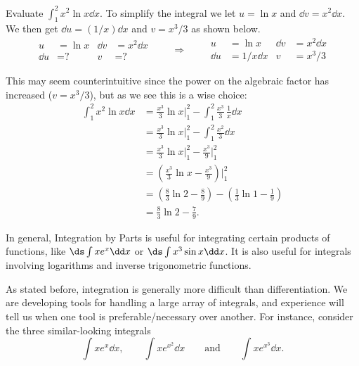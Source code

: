 \begin{example}\label{ex_ibp7}%
Evaluate $\displaystyle \int_1^2 x^2 \ln x\dd x$.
\solution
To simplify the integral we let $u=\ln x$ and $\dd v =x^2\dd x$. 
We then get $\dd u = (1/x)\dd x$ and $v=x^3/3$ as shown below.
\[
\begin{aligned}
u&= \ln x & \dd v&=x^2\dd x\\
\dd u&= \text{?} & v&=\text{?}
\end{aligned}
\qquad\Rightarrow\qquad
\begin{aligned}
u&= \ln x& \dd v&=x^2\dd x\\
\dd u&= 1/x\dd x & v&=x^3/3
\end{aligned}
\]

This may seem counterintuitive since the power on the algebraic factor has increased ($v=x^3/3$), but as we see this is a wise choice:
\begin{align*}
	\int_1^2 x^2 \ln x\dd x
	&= \frac{x^3}3\ln x\bigg|_1^2 - \int_1^2 \frac{x^3}{3}\,\frac 1x\dd x \\
	&=  \frac{x^3}3\ln x\bigg|_1^2 - \int_1^2 \frac{x^2}{3}\dd x \\
	&=  \frac{x^3}3\ln x\bigg|_1^2 - \frac{x^3}{9}\bigg|_1^2\\
	&=  \left(\frac{x^3}3\ln x - \frac{x^3}{9}\right)\bigg|_1^2\\
	&=	\left(\frac83\ln 2 - \frac89\right)-\left(\frac13\ln 1 - \frac19\right) \\
	&= \frac83\ln 2 - \frac79. %
\end{align*}
\end{example}

In general, Integration by Parts is useful for integrating certain products of functions, like $\ds\int x e^x\dd x$ or $\ds\int x^3\sin x\dd x$.   It is also useful for integrals involving logarithms and inverse trigonometric functions.

As stated before, integration is generally more difficult than differentiation. We are developing tools for handling a large array of integrals, and experience will tell us when one tool is preferable/necessary over another. For instance, consider the three similar-looking integrals 
\[
\int xe^x\dd x, \qquad  \int x e^{x^2}\dd x \qquad \text{and} \qquad \int xe^{x^3}\dd x.
\]

